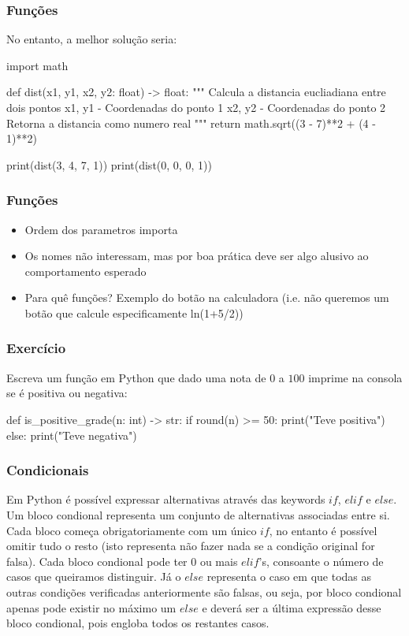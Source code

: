 \documentclass{beamer}
\begin{document}
\begin{frame}[containsverbatim]
    \frametitle{Funções}
    No entanto, a melhor solução seria:
    \begin{pythonlst}
        import math

        def dist(x1, y1, x2, y2: float) -> float:
            """ Calcula a distancia eucliadiana entre dois pontos
                x1, y1 - Coordenadas do ponto 1
                x2, y2 - Coordenadas do ponto 2
                Retorna a distancia como numero real """
            return math.sqrt((3 - 7)**2 + (4 - 1)**2)
        
        print(dist(3, 4, 7, 1))
        print(dist(0, 0, 0, 1))
    \end{pythonlst}
\end{frame}

\begin{frame}
    \frametitle{Funções}
    \begin{itemize}
        \item Ordem dos parametros importa
        \item Os nomes não interessam, mas por boa prática deve ser algo alusivo ao comportamento esperado
        \item Para quê funções? Exemplo do botão na calculadora (i.e. não queremos um botão que calcule especificamente ln(1+5/2))
    \end{itemize}
\end{frame}

\begin{frame}[containsverbatim]
    \frametitle{Exercício}
    Escreva um função em Python que dado uma nota de $0$ a $100$ imprime na 
    consola se é positiva ou negativa:
    \vspace{4mm}
    \begin{pythonlst}
        def is_positive_grade(n: int) -> str:
            if round(n) >= 50:
                print("Teve positiva")
            else:
                print("Teve negativa") 
    \end{pythonlst}
\end{frame}

\begin{frame}
    \frametitle{Condicionais}
    Em Python é possível expressar alternativas através das keywords $if$, $elif$
    e $else$. Um bloco condional representa um conjunto de alternativas associadas
    entre si. Cada bloco começa obrigatoriamente com um único $if$, no entanto
    é possível omitir tudo o resto (isto representa não fazer nada se a condição
    original for falsa). Cada bloco condional pode ter $0$ ou mais $elif$'s, 
    consoante o número de casos que queiramos distinguir. Já o $else$ representa 
    o caso em que todas as outras condições verificadas anteriormente são falsas,
    ou seja, por bloco condional apenas pode existir no máximo um $else$ e deverá
    ser a última expressão desse bloco condional, pois engloba todos os restantes
    casos.
\end{frame}
\end{document}
